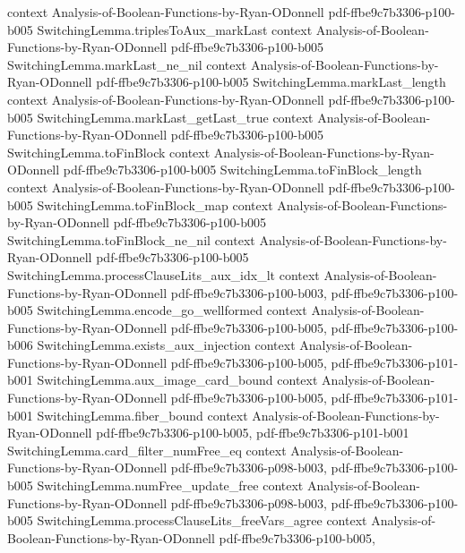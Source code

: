 \begin{lemma}
  {context}
  {Analysis-of-Boolean-Functions-by-Ryan-ODonnell}
  {pdf-ffbe9c7b3306-p100-b005}
\proofstep
  {SwitchingLemma.triplesToAux_markLast}
  {context}
  {Analysis-of-Boolean-Functions-by-Ryan-ODonnell}
  {pdf-ffbe9c7b3306-p100-b005}
\proofstep
  {SwitchingLemma.markLast_ne_nil}
  {context}
  {Analysis-of-Boolean-Functions-by-Ryan-ODonnell}
  {pdf-ffbe9c7b3306-p100-b005}
\proofstep
  {SwitchingLemma.markLast_length}
  {context}
  {Analysis-of-Boolean-Functions-by-Ryan-ODonnell}
  {pdf-ffbe9c7b3306-p100-b005}
\proofstep
  {SwitchingLemma.markLast_getLast_true}
  {context}
  {Analysis-of-Boolean-Functions-by-Ryan-ODonnell}
  {pdf-ffbe9c7b3306-p100-b005}
\proofstep
  {SwitchingLemma.toFinBlock}
  {context}
  {Analysis-of-Boolean-Functions-by-Ryan-ODonnell}
  {pdf-ffbe9c7b3306-p100-b005}
\proofstep
  {SwitchingLemma.toFinBlock_length}
  {context}
  {Analysis-of-Boolean-Functions-by-Ryan-ODonnell}
  {pdf-ffbe9c7b3306-p100-b005}
\proofstep
  {SwitchingLemma.toFinBlock_map}
  {context}
  {Analysis-of-Boolean-Functions-by-Ryan-ODonnell}
  {pdf-ffbe9c7b3306-p100-b005}
\proofstep
  {SwitchingLemma.toFinBlock_ne_nil}
  {context}
  {Analysis-of-Boolean-Functions-by-Ryan-ODonnell}
  {pdf-ffbe9c7b3306-p100-b005}
\proofstep
  {SwitchingLemma.processClauseLits_aux_idx_lt}
  {context}
  {Analysis-of-Boolean-Functions-by-Ryan-ODonnell}
  {pdf-ffbe9c7b3306-p100-b003,
    pdf-ffbe9c7b3306-p100-b005}
\proofstep
  {SwitchingLemma.encode_go_wellformed}
  {context}
  {Analysis-of-Boolean-Functions-by-Ryan-ODonnell}
  {pdf-ffbe9c7b3306-p100-b005,
    pdf-ffbe9c7b3306-p100-b006}
\proofstep
  {SwitchingLemma.exists_aux_injection}
  {context}
  {Analysis-of-Boolean-Functions-by-Ryan-ODonnell}
  {pdf-ffbe9c7b3306-p100-b005,
    pdf-ffbe9c7b3306-p101-b001}
\proofstep
  {SwitchingLemma.aux_image_card_bound}
  {context}
  {Analysis-of-Boolean-Functions-by-Ryan-ODonnell}
  {pdf-ffbe9c7b3306-p100-b005,
    pdf-ffbe9c7b3306-p101-b001}
\proofstep
  {SwitchingLemma.fiber_bound}
  {context}
  {Analysis-of-Boolean-Functions-by-Ryan-ODonnell}
  {pdf-ffbe9c7b3306-p100-b005,
    pdf-ffbe9c7b3306-p101-b001}
\proofstep
  {SwitchingLemma.card_filter_numFree_eq}
  {context}
  {Analysis-of-Boolean-Functions-by-Ryan-ODonnell}
  {pdf-ffbe9c7b3306-p098-b003,
    pdf-ffbe9c7b3306-p100-b005}
\proofstep
  {SwitchingLemma.numFree_update_free}
  {context}
  {Analysis-of-Boolean-Functions-by-Ryan-ODonnell}
  {pdf-ffbe9c7b3306-p098-b003,
    pdf-ffbe9c7b3306-p100-b005}
\proofstep
  {SwitchingLemma.processClauseLits_freeVars_agree}
  {context}
  {Analysis-of-Boolean-Functions-by-Ryan-ODonnell}
  {pdf-ffbe9c7b3306-p100-b005,
}
\end{lemma}
